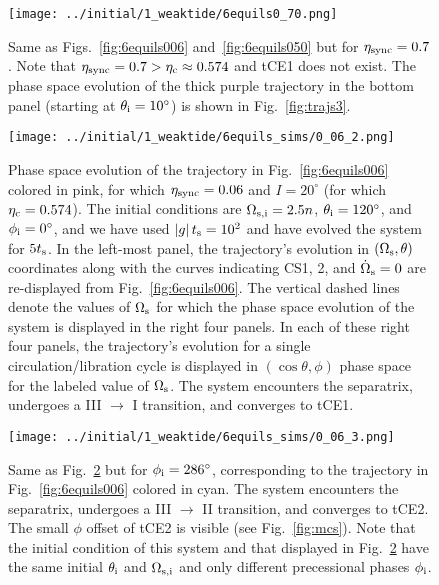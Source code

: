 \documentclass[
        fleqn,
        usenatbib,
    ]{mnras}
\newcommand*{\abs}[1]{\left|#1\right|}
\newcommand*{\p}[1]{\left(#1\right)}
\begin{document}
\begin{figure*}
    \centering
    \texttt{[image: ../initial/1\_weaktide/6equils0\_70.png]}
    \caption{Same as Figs.~\ref{fig:6equils006} and~\ref{fig:6equils050} but for
    $\eta_{\rm sync} = 0.7$. Note that $\eta_{\rm sync} = 0.7 > \eta_{\rm c}
    \approx 0.574$ and tCE1 does not exist. The phase space evolution of the
    thick purple trajectory in the bottom panel (starting at $\theta_{\rm i}
    = 10^\circ$) is shown in Fig.~\ref{fig:trajs3}. }\label{fig:6equils070}
\end{figure*}
\begin{figure}
    \centering
    \texttt{[image: ../initial/1\_weaktide/6equils\_sims/0\_06\_2.png]}
    \caption{Phase space evolution of the trajectory in
    Fig.~\ref{fig:6equils006} colored in pink, for which $\eta_{\rm sync} =
    0.06$ and $I = 20^\circ$ (for which $\eta_{\rm c} = 0.574$). The initial
    conditions are $\Omega_{\rm s, i} = 2.5n$, $\theta_{\rm i} = 120^\circ$, and
    $\phi_{\rm i} = 0^\circ$, and we have used $\abs{g}t_{\rm s} = 10^2$ and
    have evolved the system for $5t_{\rm s}$. In the left-most panel, the
    trajectory's evolution in $\p{\Omega_{\rm s}, \theta}$ coordinates along
    with the curves indicating CS1, 2, and $\dot{\Omega}_{\rm s} = 0$ are
    re-displayed from Fig.~\ref{fig:6equils006}. The vertical dashed lines
    denote the values of $\Omega_{\rm s}$ for which the phase space evolution of
    the system is displayed in the right four panels. In each of these right
    four panels, the trajectory's evolution for a single circulation/libration
    cycle is displayed in $\p{\cos \theta, \phi}$ phase space for the labeled
    value of $\Omega_{\rm s}$. The system encounters the separatrix, undergoes a
    III $\to$ I transition, and converges to tCE1.
    }\label{fig:trajs1}
\end{figure}
\begin{figure}
    \texttt{[image: ../initial/1\_weaktide/6equils\_sims/0\_06\_3.png]}
    \caption{Same as Fig.~\ref{fig:trajs1} but for $\phi_{\rm i} = 286^\circ$,
    corresponding to the trajectory in Fig.~\ref{fig:6equils006} colored in
    cyan. The system encounters the separatrix, undergoes a III $\to$ II
    transition, and converges to tCE2. The small $\phi$ offset of tCE2 is
    visible (see Fig.~\ref{fig:mcs}). Note that the initial condition of this
    system and that displayed in Fig.~\ref{fig:trajs1} have the same initial
    $\theta_{\rm i}$ and $\Omega_{\rm s, i}$ and only different precessional
    phases $\phi_{\rm i}$.
    }\label{fig:trajs2}
\end{figure}
\end{document}
